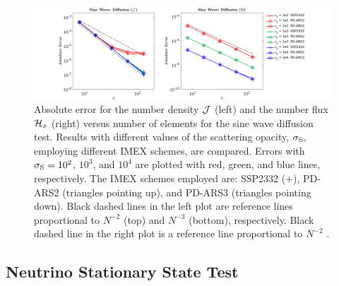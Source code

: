 \begin{figure}[h]
  \centering
  \centerline{\includegraphics[width=1.2\textwidth]{figures/SineWaveDiffusion}}
   \caption{Absolute error for the number density $\mathcal{J}$ (left) and the number flux $\mathcal{H}_{x}$ (right) versus number of elements for the sine wave diffusion test.  Results with different values of the scattering opacity, $\sigma_{{\rm S}}$, employing different IMEX schemes, are compared.  Errors with $\sigma_{{\rm S}}=10^{2}$, $10^{3}$, and $10^{4}$ are plotted with red, green, and blue lines, respectively.  The IMEX schemes employed are:  SSP2332 ($+$), PD-ARS2 (triangles pointing up), and PD-ARS3 (triangles pointing down). Black dashed lines in the left plot are reference lines proportional to $N^{-2}$ (top) and $N^{-3}$ (bottom), respectively. Black dashed line in the right plot is a reference line proportional to $N^{-2}$ .}
   \label{fig:SineWaveDiffusionJ}
\end{figure}

\subsection{Neutrino Stationary State Test} \label{se: Neutrino Stationary State Test}

